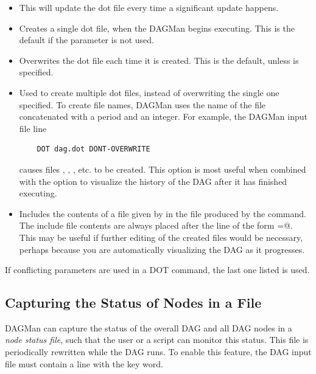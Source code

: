 \begin{itemize}

\item {}  This will update the dot file every time a
significant update happens. 

\item {} Creates a single dot file, when
the DAGMan begins executing. This is the default if the parameter
 is not used.

\item {} Overwrites the dot file each time it
is created. This is the default, unless 
is specified.

\item {} Used to create multiple dot files, instead
of overwriting the single one specified.
To create file names,
DAGMan uses the name of the file concatenated with a period and an
integer. For example, the DAGMan input file line
\begin{verbatim}
    DOT dag.dot DONT-OVERWRITE
\end{verbatim}
causes files
,
,
,
etc. to be created.
This option is
most useful when combined with the  option to
visualize the history of the DAG after it has finished executing. 

\item {} Includes the contents
of a file given by  in the file produced by the
 command.
The include file contents are always placed after the line of
the form
\verb@label=@.
This may be useful if further editing of the created files would
be necessary,
perhaps because you are automatically visualizing the DAG as it
progresses. 

\end{itemize}

If conflicting parameters are used in a DOT command, the last one
listed is used.

\subsection{\label{sec:DAG-node-status}Capturing the Status of Nodes in a File}

DAGMan can capture the status of the overall DAG and all DAG nodes
in a \emph{node status file},
such that the user or a script can monitor this status.
This file is periodically rewritten
while the DAG runs.
To enable this feature, the DAG input file must contain a line with the
 key word.

